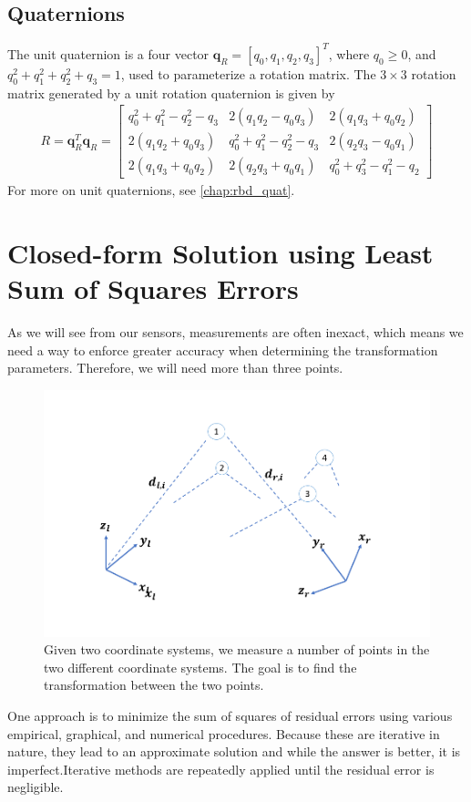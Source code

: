 \subsection{Quaternions}
The unit quaternion is a four vector $\bm{q}_R = \left[q_0, q_1, q_2, q_3\right]^T$, where $q_0 \ge 0$, and $q_0^2 + q_1^2 + q_2^2 + q_3 = 1$, used to parameterize a rotation matrix. The $3\times3$ rotation matrix generated by a unit rotation quaternion is given by
%
\begin{align}
	R = \bm{q}_R^T \bm{q}_R  = \begin{bmatrix}
	q_0^2 + q_1^2 - q_2^2 - q_3 & 2(q_1q_2 - q_0q_3) & 2\left(q_1q_3 + q_0q_2\right) \\
	2(q_1q_2 + q_0q_3) & q_0^2 + q_1^2 - q_2^2 - q_3 & 2(q_2q_3 - q_0q_1) \\
	2(q_1q_3 + q_0q_2) &  2(q_2q_3 + q_0q_1) & 	q_0^2 + q_3^2 - q_1^2 - q_2 
	\end{bmatrix}
\end{align}
%
For more on unit quaternions, see \autoref{chap:rbd_quat}.

\section{Closed-form Solution using Least Sum of Squares Errors}
\label{chap:opt_rot::least_sum}  
%
As we will see from our sensors, measurements are often inexact, which means we need a way to enforce greater accuracy when determining the transformation parameters. Therefore, we will need more than three points.
%
\begin{figure}[tb!]
	\centering
	\includegraphics[width=.85\columnwidth]{figures/least_squares.png}
	\caption{Given two coordinate systems, we measure a number of points in the two different coordinate systems. The goal is to find the transformation between the two points.}
	\label{fig:least_squares}
\end{figure}
%
One approach is to minimize the sum of squares of residual errors using various empirical, graphical, and numerical procedures. Because these are iterative in nature, they lead to an approximate solution and while the answer is better, it is imperfect.Iterative methods are repeatedly applied until the residual error is negligible.

